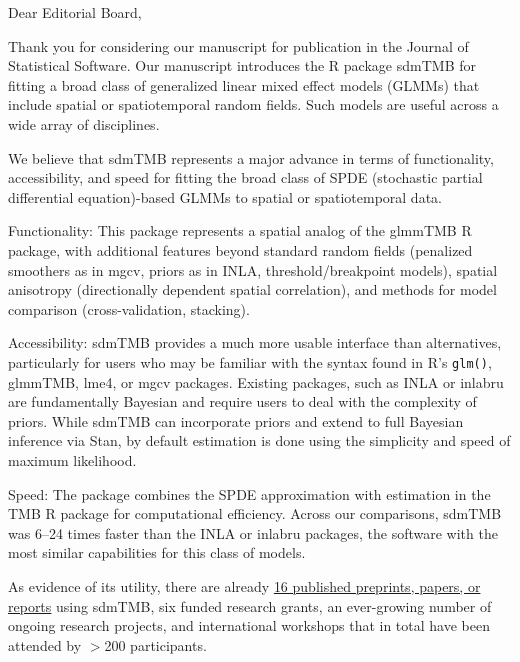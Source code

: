 \documentclass[letterpaper]{letter}
\providecommand{\pkg}[1]{{\normalfont\fontseries{b}\selectfont #1}}
\let\proglang=\textsf
\begin{document}
\begin{letter}{}
\pagestyle{empty}

\opening{Dear Editorial Board,}

Thank you for considering our manuscript for publication in the Journal of Statistical Software. Our manuscript introduces the \proglang{R} package \pkg{sdmTMB} for fitting a broad class of generalized linear mixed effect models (GLMMs) that include spatial or spatiotemporal random fields. Such models are useful across a wide array of disciplines.

We believe that \pkg{sdmTMB} represents a major advance in terms of functionality, accessibility, and speed for fitting the broad class of SPDE (stochastic partial differential equation)-based GLMMs to spatial or spatiotemporal data.

Functionality: This package represents a spatial analog of the \pkg{glmmTMB} \proglang{R} package, with additional features beyond standard random fields (penalized smoothers as in \pkg{mgcv}, priors as in \pkg{INLA}, threshold/breakpoint models), spatial anisotropy (directionally dependent spatial correlation), and methods for model comparison (cross-validation, stacking).

Accessibility: \pkg{sdmTMB} provides a much more usable interface than alternatives, particularly for users who may be familiar with the syntax found in \proglang{R}'s \texttt{glm()}, \pkg{glmmTMB}, \pkg{lme4}, or \pkg{mgcv} packages. Existing packages, such as \pkg{INLA} or \pkg{inlabru} are fundamentally Bayesian and require users to deal with the complexity of priors. While \pkg{sdmTMB} can incorporate priors and extend to full Bayesian inference via \pkg{Stan}, by default estimation is done using the simplicity and speed of maximum likelihood.

Speed: The package combines the SPDE approximation with estimation in the \pkg{TMB} \proglang{R} package for computational efficiency. Across our comparisons, \pkg{sdmTMB} was 6--24 times faster than the \pkg{INLA} or \pkg{inlabru} packages, the software with the most similar capabilities for this class of models.

As evidence of its utility, there are already \href{https://github.com/pbs-assess/sdmTMB/wiki/Publications-using-sdmTMB}{16 published preprints, papers, or reports} using \pkg{sdmTMB}, six funded research grants, an ever-growing number of ongoing research projects, and international workshops that in total have been attended by $>$200 participants.


\end{letter}
\end{document}
